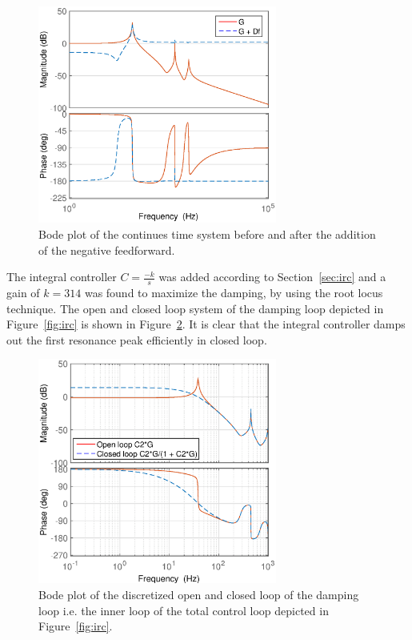 \begin{figure}[h!]
  \centering
  \includegraphics[width=0.7\textwidth]{fig/matlab/bodeafterfeedf.eps}
  \caption{\label{fig:bodeafterfeedf} Bode plot of the continues time system before and after the addition of the negative feedforward.}
\end{figure}

The integral controller $C=\frac{-k}{s}$ was added according to Section~\ref{sec:irc} and a gain of $k=314$ was found to maximize the damping, by using the root locus technique.
The open and closed loop system of the \abbrIRC damping loop depicted in Figure~\ref{fig:irc} is shown in Figure~\ref{fig:bodedamped}. It is clear that the integral controller damps out the first resonance peak efficiently in closed loop.

\begin{figure}[h!]
  \centering
  \includegraphics[width=0.7\textwidth]{fig/matlab/bodedamped2}
  \caption{\label{fig:bodedamped} Bode plot of the discretized open and closed loop of the \abbrIRC damping loop i.e. the inner loop of the total control loop depicted in Figure~\ref{fig:irc}.}
\end{figure}

